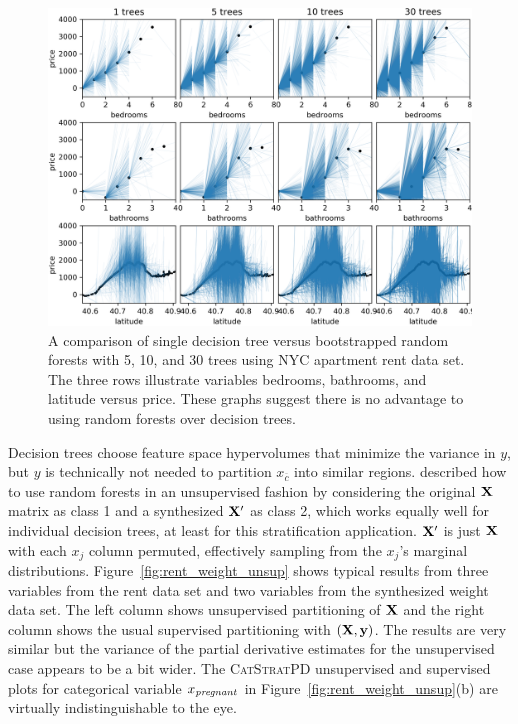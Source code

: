 \documentclass[12pt]{article}
\newcommand{\figref}[1]{Figure~\ref{#1}}
\newcommand{\cspd}{\fontfamily{cmr}\textsc{\small CatStratPD}}
\newcommand{\xnc}{$x_{\overline{c}}$}
\begin{document}
\begin{figure}[htbp]
\begin{center}
\includegraphics[scale=0.55]{images/rent_ntrees.png}
\caption{A comparison of single decision tree versus bootstrapped random forests with 5, 10, and 30 trees using NYC apartment rent data set. The three rows illustrate variables bedrooms, bathrooms, and latitude versus price. These graphs suggest there is no advantage to using random forests over decision trees.}
\label{fig:rent_ntrees}
\end{center}
\end{figure}

Decision trees choose feature space hypervolumes that minimize the variance in $y$, but $y$ is technically not needed to partition \xnc{} into similar regions. \cite{RFunsup} described how to use random forests in an unsupervised fashion by considering the original $\bf X$ matrix as class 1 and a synthesized $\bf X'$ as class 2, which works equally well for individual decision trees, at least for this stratification application. $\bf X'$ is just $\bf X$ with each $x_j$ column permuted, effectively sampling from the $x_j$'s marginal distributions. \figref{fig:rent_weight_unsup} shows typical results from three variables from the rent data set and two variables from the synthesized weight data set.  The left column shows unsupervised partitioning of $\bf X$ and the right column shows the usual supervised partitioning with $(\bf X, y)$. The results are very similar but the variance of the partial derivative estimates for the unsupervised case appears to be a bit wider. The \cspd{} unsupervised and supervised plots for categorical variable $x_{\it pregnant}$ in \figref{fig:rent_weight_unsup}(b) are virtually indistinguishable to the eye. 
\end{document}
